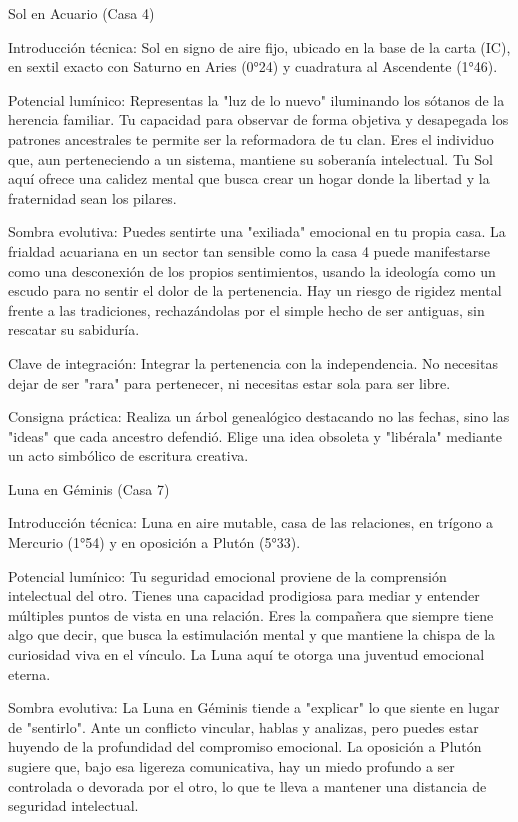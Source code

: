 Sol en Acuario (Casa 4)

Introducción técnica: Sol en signo de aire fijo, ubicado en la base de la carta (IC), en sextil exacto con Saturno en Aries (0°24) y cuadratura al Ascendente (1°46).

Potencial lumínico: Representas la "luz de lo nuevo" iluminando los sótanos de la herencia familiar. Tu capacidad para observar de forma objetiva y desapegada los patrones ancestrales te permite ser la reformadora de tu clan. Eres el individuo que, aun perteneciendo a un sistema, mantiene su soberanía intelectual. Tu Sol aquí ofrece una calidez mental que busca crear un hogar donde la libertad y la fraternidad sean los pilares.

Sombra evolutiva: Puedes sentirte una "exiliada" emocional en tu propia casa. La frialdad acuariana en un sector tan sensible como la casa 4 puede manifestarse como una desconexión de los propios sentimientos, usando la ideología como un escudo para no sentir el dolor de la pertenencia. Hay un riesgo de rigidez mental frente a las tradiciones, rechazándolas por el simple hecho de ser antiguas, sin rescatar su sabiduría.

Clave de integración: Integrar la pertenencia con la independencia. No necesitas dejar de ser "rara" para pertenecer, ni necesitas estar sola para ser libre.

Consigna práctica: Realiza un árbol genealógico destacando no las fechas, sino las "ideas" que cada ancestro defendió. Elige una idea obsoleta y "libérala" mediante un acto simbólico de escritura creativa.

Luna en Géminis (Casa 7)

Introducción técnica: Luna en aire mutable, casa de las relaciones, en trígono a Mercurio (1°54) y en oposición a Plutón (5°33).

Potencial lumínico: Tu seguridad emocional proviene de la comprensión intelectual del otro. Tienes una capacidad prodigiosa para mediar y entender múltiples puntos de vista en una relación. Eres la compañera que siempre tiene algo que decir, que busca la estimulación mental y que mantiene la chispa de la curiosidad viva en el vínculo. La Luna aquí te otorga una juventud emocional eterna.

Sombra evolutiva: La Luna en Géminis tiende a "explicar" lo que siente en lugar de "sentirlo". Ante un conflicto vincular, hablas y analizas, pero puedes estar huyendo de la profundidad del compromiso emocional. La oposición a Plutón sugiere que, bajo esa ligereza comunicativa, hay un miedo profundo a ser controlada o devorada por el otro, lo que te lleva a mantener una distancia de seguridad intelectual.

